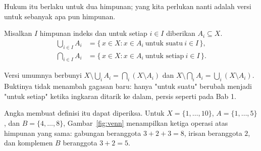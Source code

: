 Hukum itu berlaku untuk dua himpunan; yang kita perlukan nanti adalah versi untuk
sebanyak apa pun himpunan.

\begin{definisi}
Misalkan $I$ himpunan indeks dan untuk setiap $i \in I$ diberikan $A_i \subseteq X$.
\begin{align*}
  \bigcup_{i \in I} A_i &= \{\, x \in X : x \in A_i \ \text{untuk suatu}\ i \in I \,\}, \\
  \bigcap_{i \in I} A_i &= \{\, x \in X : x \in A_i \ \text{untuk setiap}\ i \in I \,\}.
\end{align*}
\end{definisi}

Versi umumnya berbunyi $X \setminus \bigcup_{i} A_i = \bigcap_{i} (X \setminus A_i)$
dan $X \setminus \bigcap_{i} A_i = \bigcup_{i} (X \setminus A_i)$. Buktinya tidak
menambah gagasan baru: hanya "untuk suatu" berubah menjadi "untuk setiap" ketika
ingkaran ditarik ke dalam, persis seperti pada Bab 1.

Angka membuat definisi itu dapat diperiksa. Untuk $X = \{1,\dots,10\}$,
$A = \{1,\dots,5\}$, dan $B = \{4,\dots,8\}$, Gambar~\ref{fig:venn} menampilkan
ketiga operasi atas himpunan yang sama: gabungan beranggota $3 + 2 + 3 = 8$, irisan
beranggota $2$, dan komplemen $B$ beranggota $3 + 2 = 5$.

